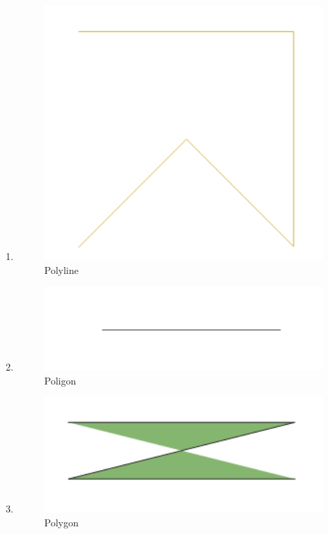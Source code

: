 \begin{enumerate}
	\item 
	
	\begin{figure}[H]
		\includegraphics[width=12cm]{figures/1174008/2/hasilsoal5.PNG}
		\centering
		\caption{Polyline}
	\end{figure}
	
	\item 
	
	\begin{figure}[H]
		\includegraphics[width=12cm]{figures/1174008/2/hasilsoal6.PNG}
		\centering
		\caption{Poligon}
	\end{figure}
	
	\item 
	
	\begin{figure}[H]
		\includegraphics[width=12cm]{figures/1174008/2/hasilsoal7.PNG}
		\centering
		\caption{Polygon}
	\end{figure}
	

\end{enumerate}

